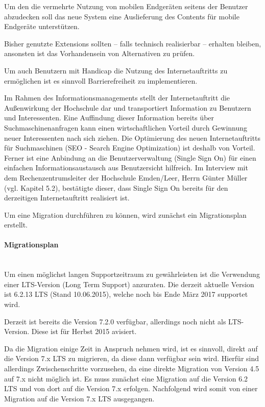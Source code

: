 Um den die vermehrte Nutzung von mobilen Endgeräten seitens der Benutzer abzudecken soll das neue System eine Auslieferung des Contents für mobile Endgeräte unterstützen. 

Bisher genutzte Extensions sollten – falls technisch realisierbar – erhalten bleiben, ansonsten ist das Vorhandensein von Alternativen zu prüfen. 

Um auch Benutzern mit Handicap die Nutzung des Internetauftritts zu ermöglichen ist es sinnvoll Barrierefreiheit zu implementieren. 

Im Rahmen des Informationsmanagements stellt der Internetauftritt die Außenwirkung der Hochschule dar und transportiert Information zu Benutzern und Interessenten. Eine Auffindung dieser Information bereits über Suchmaschinenanfragen kann einen wirtschaftlichen Vorteil durch Gewinnung neuer Interessenten nach sich ziehen. Die Optimierung des neuen Internetauftritts für Suchmaschinen (SEO - Search Engine Optimization) ist deshalb von Vorteil. Ferner ist eine Anbindung an die Benutzerverwaltung (Single Sign On) für einen einfachen Informationsaustausch aus Benutzersicht hilfreich. Im Interview mit dem Rechenzentrumsleiter der Hochschule Emden/Leer, Herrn Günter Müller (vgl. Kapitel 5.2), bestätigte dieser, dass Single Sign On bereits für den derzeitigen Internetauftritt realisiert ist. 

Um eine Migration durchführen zu können, wird zunächst ein Migrationsplan erstellt.

\paragraph{Migrationsplan}\mbox{}\\
Um einen möglichst langen Supportzeitraum zu gewährleisten ist die Verwendung einer LTS-Version (Long Term Support) anzuraten. Die derzeit aktuelle Version ist 6.2.13 LTS (Stand 10.06.2015), welche noch bis Ende März 2017 supportet wird.

Derzeit ist bereits die Version 7.2.0 verfügbar, allerdings noch nicht als LTS-Version. Diese ist für Herbst 2015 avisiert. 

Da die Migration einige Zeit in Anspruch nehmen wird, ist es sinnvoll, direkt auf die Version 7.x LTS zu migrieren, da diese dann verfügbar sein wird. Hierfür sind allerdings Zwischenschritte vorzusehen, da eine direkte Migration von Version 4.5 auf 7.x nicht möglich ist.\cite{typo3_migration_2015} Es muss zunächst eine Migration auf die Version 6.2 LTS und von dort auf die Version 7.x erfolgen. Nachfolgend wird somit von einer Migration auf die Version 7.x LTS ausgegangen.

